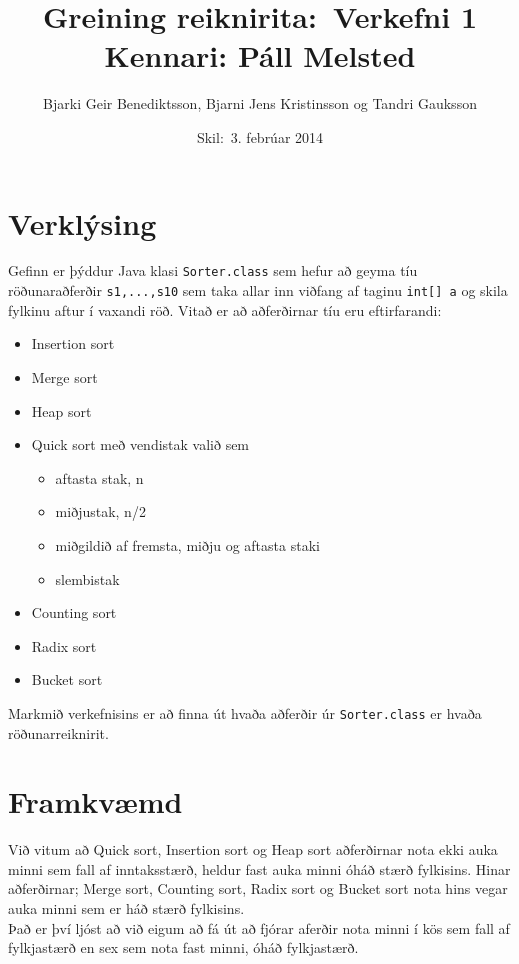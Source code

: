 \documentclass[a4paper,oneside]{article}
\title{
    Greining reiknirita:\ Verkefni 1
    \\\small{Kennari: Páll Melsted}
}
\author{Bjarki Geir Benediktsson, Bjarni Jens Kristinsson og Tandri Gauksson}
\date{\small{Skil:\ 3. febrúar 2014}}
\begin{document}
\maketitle

\section{Verklýsing}
Gefinn er þýddur Java klasi \texttt{Sorter.class} sem hefur að geyma tíu röðunaraðferðir \texttt{s1,...,s10} sem taka allar inn viðfang af taginu \texttt{int[] a} og skila fylkinu aftur í vaxandi röð. Vitað er að aðferðirnar tíu eru eftirfarandi:
\begin{itemize}
    \item Insertion sort
    \item Merge sort
    \item Heap sort
    \item Quick sort með vendistak valið sem
    \begin{itemize}
        \item aftasta stak, n
        \item miðjustak, n/2
        \item miðgildið af fremsta, miðju og aftasta staki
        \item slembistak
    \end{itemize}
    \item Counting sort
    \item Radix sort
    \item Bucket sort
\end{itemize}

Markmið verkefnisins er að finna út hvaða aðferðir úr \texttt{Sorter.class} er hvaða röðunarreiknirit.

\section{Framkvæmd}
Við vitum að Quick sort, Insertion sort og Heap sort aðferðirnar nota ekki auka minni sem fall af inntaksstærð, heldur fast auka minni óháð stærð fylkisins. Hinar aðferðirnar; Merge sort, Counting sort, Radix sort og Bucket sort nota hins vegar auka minni sem er háð stærð fylkisins. \\

\noindent Það er því ljóst að við eigum að fá út að fjórar aferðir nota minni í kös sem fall af fylkjastærð en sex sem nota fast minni, óháð fylkjastærð. \\
\end{document}
